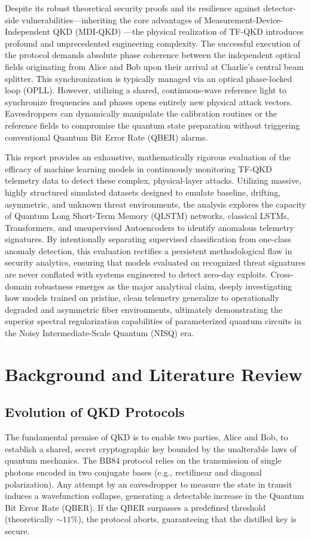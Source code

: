 \documentclass[10pt, journal, letterpaper, twocolumn]{IEEEtran}
\begin{document}
Despite its robust theoretical security proofs and its resilience against detector-side vulnerabilities—inheriting the core advantages of Measurement-Device-Independent QKD (MDI-QKD) \cite{mdi}—the physical realization of TF-QKD introduces profound and unprecedented engineering complexity. The successful execution of the protocol demands absolute phase coherence between the independent optical fields originating from Alice and Bob upon their arrival at Charlie's central beam splitter. This synchronization is typically managed via an optical phase-locked loop (OPLL). However, utilizing a shared, continuous-wave reference light to synchronize frequencies and phases opens entirely new physical attack vectors. Eavesdroppers can dynamically manipulate the calibration routines or the reference fields to compromise the quantum state preparation without triggering conventional Quantum Bit Error Rate (QBER) alarms.

This report provides an exhaustive, mathematically rigorous evaluation of the efficacy of machine learning models in continuously monitoring TF-QKD telemetry data to detect these complex, physical-layer attacks. Utilizing massive, highly structured simulated datasets designed to emulate baseline, drifting, asymmetric, and unknown threat environments, the analysis explores the capacity of Quantum Long Short-Term Memory (QLSTM) networks, classical LSTMs, Transformers, and unsupervised Autoencoders to identify anomalous telemetry signatures. By intentionally separating supervised classification from one-class anomaly detection, this evaluation rectifies a persistent methodological flaw in security analytics, ensuring that models evaluated on recognized threat signatures are never conflated with systems engineered to detect zero-day exploits. Cross-domain robustness emerges as the major analytical claim, deeply investigating how models trained on pristine, clean telemetry generalize to operationally degraded and asymmetric fiber environments, ultimately demonstrating the superior spectral regularization capabilities of parameterized quantum circuits in the Noisy Intermediate-Scale Quantum (NISQ) era.

\section{Background and Literature Review}

\subsection{Evolution of QKD Protocols}
The fundamental premise of QKD is to enable two parties, Alice and Bob, to establish a shared, secret cryptographic key bounded by the unalterable laws of quantum mechanics. The BB84 protocol \cite{bb84} relies on the transmission of single photons encoded in two conjugate bases (e.g., rectilinear and diagonal polarization). Any attempt by an eavesdropper to measure the state in transit induces a wavefunction collapse, generating a detectable increase in the Quantum Bit Error Rate (QBER). If the QBER surpasses a predefined threshold (theoretically $\sim 11\%$), the protocol aborts, guaranteeing that the distilled key is secure.
\end{document}
